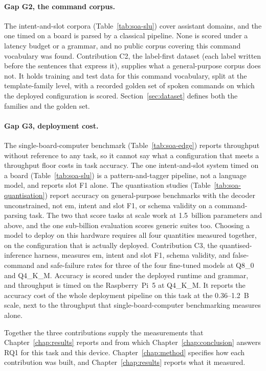 \paragraph{Gap G2, the command corpus.} The intent-and-slot corpora (Table~\ref{tab:soa-slu})
cover assistant domains, and the one timed on a board is parsed by a classical pipeline. None is
scored under a latency budget or a grammar, and no public corpus covering this command
vocabulary was found. Contribution C2, the
label-first dataset (each label written before the sentences that express it), supplies what a
general-purpose corpus does not. It holds training and test data for this command vocabulary,
split at the template-family level, with a recorded golden set of spoken commands on which the
deployed configuration is scored. Section~\ref{sec:dataset} defines both the families and the
golden set.

\paragraph{Gap G3, deployment cost.} The single-board-computer
benchmark (Table~\ref{tab:soa-edge}) reports throughput without reference to any task, so it
cannot say what a configuration that meets a throughput floor costs in task accuracy. The one
intent-and-slot system timed on a board (Table~\ref{tab:soa-slu}) is a pattern-and-tagger
pipeline, not a language model, and reports slot F1 alone. The quantisation studies (Table~\ref{tab:soa-quantisation}) report accuracy on general-purpose
benchmarks with the decoder unconstrained, not \gls{em}, intent and slot F1, or schema validity on
a command-parsing task. The two that score tasks at scale work at 1.5~billion parameters and
above, and the one sub-billion evaluation scores generic suites too. Choosing a model to deploy on
this hardware requires all four quantities measured together, on the configuration that is
actually deployed. Contribution C3, the quantised-inference harness, measures \gls{em}, intent and
slot F1, schema validity, and false-command and safe-failure rates for three of the four
fine-tuned models at Q8\_0 and Q4\_K\_M. Accuracy is scored under the deployed runtime and
grammar, and throughput is timed on the Raspberry~Pi~5 at Q4\_K\_M. It reports the accuracy cost of
the whole deployment pipeline on this task at the 0.36--1.2~B scale, next to the throughput that
single-board-computer benchmarking measures alone.

Together the three contributions supply the measurements that Chapter~\ref{chap:results} reports
and from which Chapter~\ref{chap:conclusion} answers RQ1 for this task and this device.
Chapter~\ref{chap:method} specifies how each contribution was built, and Chapter~\ref{chap:results} reports what it measured.
